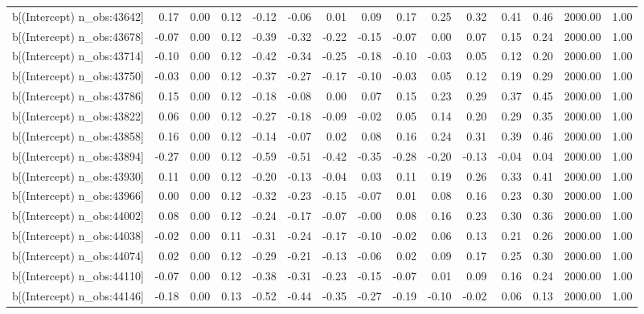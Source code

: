 \begin{table}[ht]
\begin{tabular}{rrrrrrrrrrrrrrr}
  b[(Intercept) n\_obs:43642] & 0.17 & 0.00 & 0.12 & -0.12 & -0.06 & 0.01 & 0.09 & 0.17 & 0.25 & 0.32 & 0.41 & 0.46 & 2000.00 & 1.00 \\ 
  b[(Intercept) n\_obs:43678] & -0.07 & 0.00 & 0.12 & -0.39 & -0.32 & -0.22 & -0.15 & -0.07 & 0.00 & 0.07 & 0.15 & 0.24 & 2000.00 & 1.00 \\ 
  b[(Intercept) n\_obs:43714] & -0.10 & 0.00 & 0.12 & -0.42 & -0.34 & -0.25 & -0.18 & -0.10 & -0.03 & 0.05 & 0.12 & 0.20 & 2000.00 & 1.00 \\ 
  b[(Intercept) n\_obs:43750] & -0.03 & 0.00 & 0.12 & -0.37 & -0.27 & -0.17 & -0.10 & -0.03 & 0.05 & 0.12 & 0.19 & 0.29 & 2000.00 & 1.00 \\ 
  b[(Intercept) n\_obs:43786] & 0.15 & 0.00 & 0.12 & -0.18 & -0.08 & 0.00 & 0.07 & 0.15 & 0.23 & 0.29 & 0.37 & 0.45 & 2000.00 & 1.00 \\ 
  b[(Intercept) n\_obs:43822] & 0.06 & 0.00 & 0.12 & -0.27 & -0.18 & -0.09 & -0.02 & 0.05 & 0.14 & 0.20 & 0.29 & 0.35 & 2000.00 & 1.00 \\ 
  b[(Intercept) n\_obs:43858] & 0.16 & 0.00 & 0.12 & -0.14 & -0.07 & 0.02 & 0.08 & 0.16 & 0.24 & 0.31 & 0.39 & 0.46 & 2000.00 & 1.00 \\ 
  b[(Intercept) n\_obs:43894] & -0.27 & 0.00 & 0.12 & -0.59 & -0.51 & -0.42 & -0.35 & -0.28 & -0.20 & -0.13 & -0.04 & 0.04 & 2000.00 & 1.00 \\ 
  b[(Intercept) n\_obs:43930] & 0.11 & 0.00 & 0.12 & -0.20 & -0.13 & -0.04 & 0.03 & 0.11 & 0.19 & 0.26 & 0.33 & 0.41 & 2000.00 & 1.00 \\ 
  b[(Intercept) n\_obs:43966] & 0.00 & 0.00 & 0.12 & -0.32 & -0.23 & -0.15 & -0.07 & 0.01 & 0.08 & 0.16 & 0.23 & 0.30 & 2000.00 & 1.00 \\ 
  b[(Intercept) n\_obs:44002] & 0.08 & 0.00 & 0.12 & -0.24 & -0.17 & -0.07 & -0.00 & 0.08 & 0.16 & 0.23 & 0.30 & 0.36 & 2000.00 & 1.00 \\ 
  b[(Intercept) n\_obs:44038] & -0.02 & 0.00 & 0.11 & -0.31 & -0.24 & -0.17 & -0.10 & -0.02 & 0.06 & 0.13 & 0.21 & 0.26 & 2000.00 & 1.00 \\ 
  b[(Intercept) n\_obs:44074] & 0.02 & 0.00 & 0.12 & -0.29 & -0.21 & -0.13 & -0.06 & 0.02 & 0.09 & 0.17 & 0.25 & 0.30 & 2000.00 & 1.00 \\ 
  b[(Intercept) n\_obs:44110] & -0.07 & 0.00 & 0.12 & -0.38 & -0.31 & -0.23 & -0.15 & -0.07 & 0.01 & 0.09 & 0.16 & 0.24 & 2000.00 & 1.00 \\ 
  b[(Intercept) n\_obs:44146] & -0.18 & 0.00 & 0.13 & -0.52 & -0.44 & -0.35 & -0.27 & -0.19 & -0.10 & -0.02 & 0.06 & 0.13 & 2000.00 & 1.00 \\ 

\end{tabular}
\end{table}
